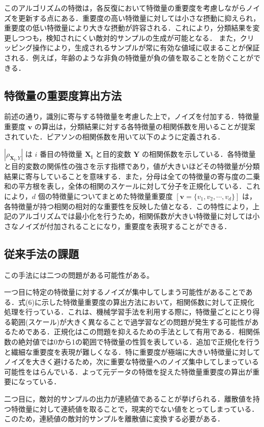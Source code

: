 このアルゴリズムの特徴は，各反復において特徴量の重要度を考慮しながらノイズを更新する点にある．重要度の高い特徴量に対しては小さな摂動に抑えられ，重要度の低い特徴量により大きな摂動が許容される．これにより，分類結果を変更しつつも，検知されにくい敵対的サンプルの生成が可能となる．
また，クリッピング操作により，生成されるサンプルが常に有効な値域に収まることが保証される．例えば，年齢のような非負の特徴量が負の値を取ることを防ぐことができる．


\subsection{特徴量の重要度算出方法}

前述の通り，識別に寄与する特徴量を考慮した上で，ノイズを付加する．特徴量重要度 $\bm{v}$ の算出は，分類結果に対する各特徴量の相関係数を用いることが提案されていた．ピアソンの相関係数を用いて以下のように定義される．

$|\rho_{\bm{X_i},Y}|$ は $i$ 番目の特徴量 $\bm{X_i}$ と目的変数 $\bm{Y}$ の相関係数を示している．各特徴量と目的変数の関係性の強さを示す指標であり，値が大きいほどその特徴量が分類結果に寄与していることを意味する．また，分母は全ての特徴量の寄与度の二乗和の平方根を表し，全体の相関のスケールに対して分子を正規化している．これにより，$d$ 個の特徴量についてまとめた特徴量重要度 $[ \bm{v} = \{v_1, v_2, \cdots, v_d\} ]$ は，各特徴量が持つ相関の相対的な重要性を反映した値となる．この特性により，上記のアルゴリズムでは最小化を行うため，相関係数が大きい特徴量に対しては小さなノイズが付加されることになり，重要度を表現することができる．



\subsection{従来手法の課題}

この手法には二つの問題がある可能性がある。

一つ目に特定の特徴量に対するノイズが集中してしまう可能性があることである．式(6)に示した特徴量重要度の算出方法において，相関係数に対して正規化処理を行っている．これは、機械学習手法を利用する際に，特徴量ごとにとり得る範囲(スケール)が大きく異なることで過学習などの問題が発生する可能性があるためである．正規化はこの問題を抑えるための手法として有用である．\cite{LawOfAwesomeDataScientist}相関係数の絶対値では0から1の範囲で特徴量の性質を表している．追加で正規化を行うと繊細な重要度を表現が難しくなる．特に重要度が極端に大きい特徴量に対してノイズを大きく避けるため，次に重要な特徴量へのノイズ集中してしまっている可能性をはらんでいる．よって元データの特徴を捉えた特徴量重要度の算出が重要になっている．

二つ目に，敵対的サンプルの出力が連続値であることが挙げられる．離散値を持つ特徴量に対して連続値を取ることで，現実的でない値をとってしまっている．このため，連続値の敵対的サンプルを離散値に変換する必要がある．
